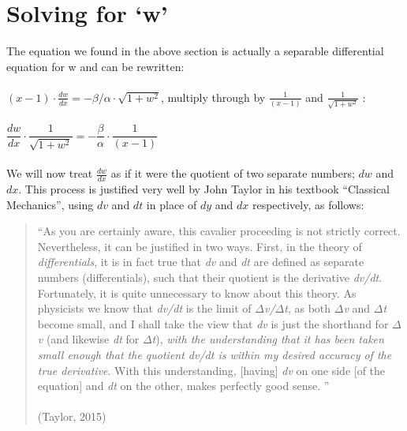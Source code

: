 \documentclass[12pt]{article}
\begin{document}
	\section{Solving for \textquoteleft w\textquoteright}
	
	\indent The equation we found in the above section is actually a separable differential equation for w and can be rewritten:
	\\
	\\
	$(x-1)\cdot\frac{dw}{dx}=-\beta/\alpha\cdot\sqrt{ 1 + w^{2}}$\hspace{1cm}, multiply through by $\frac{1}{(x-1)} $ and $\frac{1}{\sqrt{ 1 + w^{2}}} $ :
	\\
	\\
	$\dfrac{dw}{dx}\cdot \dfrac{1}{\sqrt{ 1 + w^{2}}}=-\dfrac{\beta}{\alpha}\cdot\dfrac{1}{(x-1)}$
	\\
	\\
	\indent We will now treat $\frac{dw}{dx}$ as if it were the quotient of two separate numbers; $dw$ and $dx$. This process is justified very well by John Taylor in his textbook \textquotedblleft Classical Mechanics\textquotedblright, using $dv$ and $dt$ in place of $dy$ and $dx$ respectively, as follows:
	
	\clearpage
	
	\begin{quotation}
		\textquotedblleft As you are certainly aware, this cavalier proceeding is not strictly correct. Nevertheless, it can be justified in two ways. First, in the theory of \textit{differentials}, it is in fact true that \textit{dv} and \textit{dt} are defined as separate numbers (differentials), such that their quotient is the derivative \textit{dv/dt}. Fortunately, it is quite unnecessary to know about this theory. As physicists we know that \textit{dv/dt} is the limit of \textit{$\Delta$v/$\Delta$t}, as both \textit{$\Delta$v} and \textit{$\Delta$t} become small, and I shall take the view that \textit{dv} is just the shorthand for \textit{$\Delta$v} (and likewise \textit{dt} for \textit{$\Delta$t}), \textit{with the understanding that it has been taken small enough that the quotient dv/dt is within my desired accuracy of the true derivative}. With this understanding, [having] \textit{dv} on one side [of the equation] and \textit{dt} on the other, makes perfectly good sense. \textquotedblright \\
		\\ 
		\indent (Taylor, 2015)
	\end{quotation}
	
\end{document}
